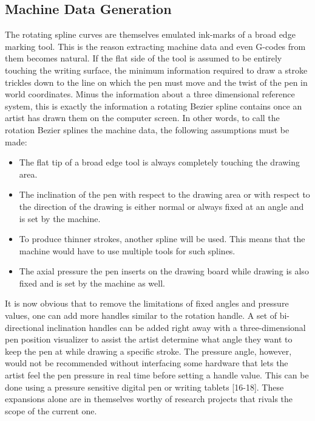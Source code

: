 \subsection{Machine Data Generation}
\label{ExplorationPoints1}
The rotating spline curves are themselves emulated ink-marks of a broad edge marking tool. This is the reason extracting machine data and even G-codes from them becomes natural. If the flat side of the tool is assumed to be entirely touching the writing surface, the minimum information required to draw a stroke trickles down to the line on which the pen must move and the twist of the pen in world coordinates. Minus the information about a three dimensional reference system, this is exactly the information a rotating Bezier spline contains once an artist has drawn them on the computer screen. In other words, to call the rotation Bezier splines the machine data, the following assumptions must be made:
\begin{itemize}
	\item The flat tip of a broad edge tool is always completely touching the drawing area.
	\item The inclination of the pen with respect to the drawing area or with respect to the direction of the drawing is either normal or always fixed at an angle and is set by the machine.
	\item To produce thinner strokes, another spline will be used. This means that the machine would have to use multiple tools for such splines.
	\item The axial pressure the pen inserts on the drawing board while drawing is also fixed and is set by the machine as well.
\end{itemize}

It is now obvious that to remove the limitations of fixed angles and pressure values, one can add more handles similar to the rotation handle. A set of bi-directional inclination handles can be added right away with a three-dimensional pen position visualizer to assist the artist determine what angle they want to keep the pen at while drawing a specific stroke. The pressure angle, however, would not be recommended without interfacing some hardware that lets the artist feel the pen pressure in real time before setting a handle value. This can be done using a pressure sensitive digital pen or writing tablets [16-18]. These expansions alone are in themselves worthy of research projects that rivals the scope of the current one.
